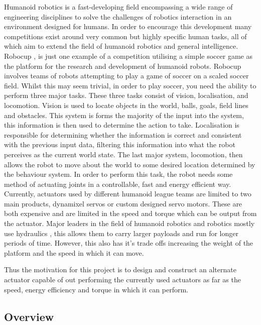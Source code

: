 \documentclass[11pt,a4paper]{article}
\begin{document}
Humanoid robotics is a fast-developing field encompassing a wide range of engineering disciplines to solve the challenges of robotics interaction in an environment designed for humans. In order to encourage this development many competitions exist around very common but highly specific human tasks, all of which aim to extend the field of humanoid robotics and general intelligence. Robocup \cite{kitano1995robocup}, is just one example of a competition utilising a simple soccer game as the platform for the research and development of humanoid robots. Robocup involves teams of robots attempting to play a game of soccer on a scaled soccer field. Whilst this may seem trivial, in order to play soccer, you need the ability to perform three major tasks. These three tasks consist of vision, localisation, and locomotion. Vision is used to locate objects in the world, balls, goals, field lines and obstacles. This system is forms the majority of the input into the system, this information is then used to determine the action to take. Localisation is responsible for determining whether the information is correct and consistent with the previous input data, filtering this information into what the robot perceives as the current world state. The last major system, locomotion, then allows the robot to move about the world to some desired location determined by the behaviour system. In order to perform this task, the robot needs some method of actuating joints in a controllable, fast and energy efficient way. Currently, actuators used by different humanoid league teams are limited to two main products, dynamixel servos \cite{robotis_mx106} or custom designed servo motors. These are both expensive and are limited in the speed and torque which can be output from the actuator. Major leaders in the field of humanoid robotics and robotics mostly use hydraulics \cite{atlas}, this allows them to carry larger payloads and run for longer periods of time. However, this also has it's trade offs increasing the weight of the platform and the speed in which it can move. \newline

Thus the motivation for this project is to design and construct an alternate actuator capable of out performing the currently used actuators as far as the speed, energy efficiency and torque in which it can perform. 

\subsection{Overview}
\label{sub:overview}
\end{document}
